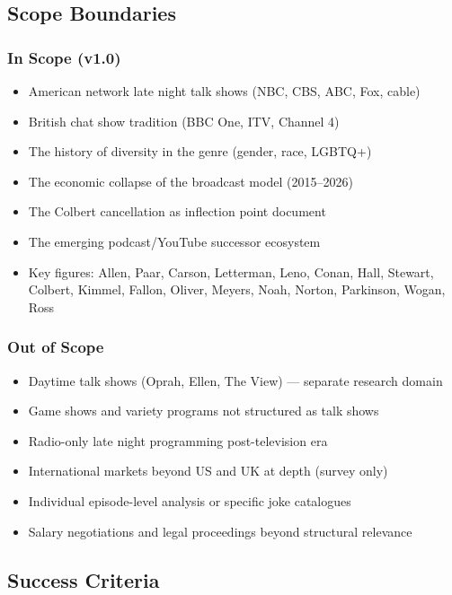 \documentclass[11pt,letterpaper]{article}
\begin{document}
\subsection{Scope Boundaries}

\subsubsection{In Scope (v1.0)}
\begin{itemize}[leftmargin=1.5em]
  \item American network late night talk shows (NBC, CBS, ABC, Fox, cable)
  \item British chat show tradition (BBC One, ITV, Channel 4)
  \item The history of diversity in the genre (gender, race, LGBTQ+)
  \item The economic collapse of the broadcast model (2015--2026)
  \item The Colbert cancellation as inflection point document
  \item The emerging podcast/YouTube successor ecosystem
  \item Key figures: Allen, Paar, Carson, Letterman, Leno, Conan, Hall, Stewart, Colbert, Kimmel, Fallon, Oliver, Meyers, Noah, Norton, Parkinson, Wogan, Ross
\end{itemize}

\subsubsection{Out of Scope}
\begin{itemize}[leftmargin=1.5em]
  \item Daytime talk shows (Oprah, Ellen, The View) --- separate research domain
  \item Game shows and variety programs not structured as talk shows
  \item Radio-only late night programming post-television era
  \item International markets beyond US and UK at depth (survey only)
  \item Individual episode-level analysis or specific joke catalogues
  \item Salary negotiations and legal proceedings beyond structural relevance
\end{itemize}

\subsection{Success Criteria}
\end{document}
